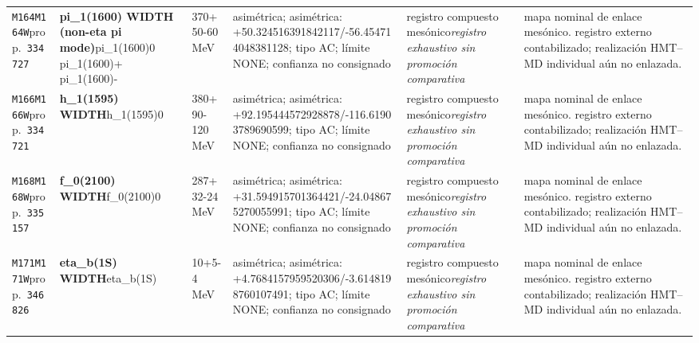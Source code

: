 \begin{landscape}
\begin{longtable}{L{1.85cm}L{4.45cm}L{2.35cm}L{4.05cm}L{3.35cm}L{7.15cm}}
\texttt{M164}\newline \texttt{M164W}\newline prop.\ \texttt{334727} & \textbf{pi\_\allowbreak{}1(1600) WIDTH (non-eta pi mode)}\newline pi\_\allowbreak{}1(1600)0 \textbar{}\allowbreak{} pi\_\allowbreak{}1(1600)+ \textbar{}\allowbreak{} pi\_\allowbreak{}1(1600)- & 370+50-60\,MeV & asimétrica; asimétrica: +50.324516391842117/-56.454714048381128; tipo AC; límite NONE; confianza no consignado & registro compuesto mesónico\newline \emph{registro exhaustivo sin promoción comparativa} & mapa nominal de enlace mesónico. registro externo contabilizado; realización HMT--MD individual aún no enlazada. \\
\texttt{M166}\newline \texttt{M166W}\newline prop.\ \texttt{334721} & \textbf{h\_\allowbreak{}1(1595) WIDTH}\newline h\_\allowbreak{}1(1595)0 & 380+90-120\,MeV & asimétrica; asimétrica: +92.195444572928878/-116.61903789690599; tipo AC; límite NONE; confianza no consignado & registro compuesto mesónico\newline \emph{registro exhaustivo sin promoción comparativa} & mapa nominal de enlace mesónico. registro externo contabilizado; realización HMT--MD individual aún no enlazada. \\
\texttt{M168}\newline \texttt{M168W}\newline prop.\ \texttt{335157} & \textbf{f\_\allowbreak{}0(2100) WIDTH}\newline f\_\allowbreak{}0(2100)0 & 287+32-24\,MeV & asimétrica; asimétrica: +31.594915701364421/-24.048675270055991; tipo AC; límite NONE; confianza no consignado & registro compuesto mesónico\newline \emph{registro exhaustivo sin promoción comparativa} & mapa nominal de enlace mesónico. registro externo contabilizado; realización HMT--MD individual aún no enlazada. \\
\texttt{M171}\newline \texttt{M171W}\newline prop.\ \texttt{346826} & \textbf{eta\_\allowbreak{}b(1S) WIDTH}\newline eta\_\allowbreak{}b(1S) & 10+5-4\,MeV & asimétrica; asimétrica: +4.7684157959520306/-3.6148198760107491; tipo AC; límite NONE; confianza no consignado & registro compuesto mesónico\newline \emph{registro exhaustivo sin promoción comparativa} & mapa nominal de enlace mesónico. registro externo contabilizado; realización HMT--MD individual aún no enlazada. \\

\end{longtable}
\end{landscape}
